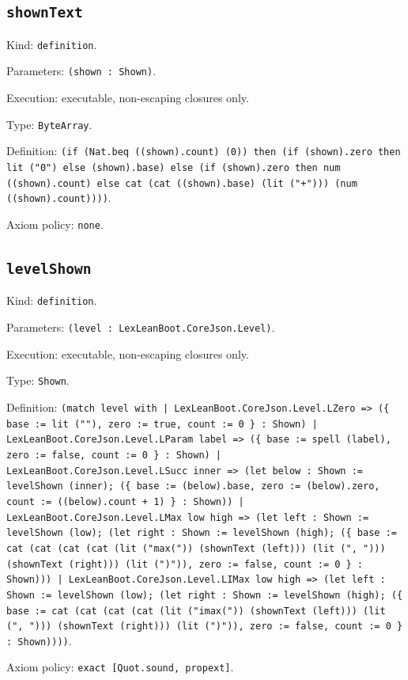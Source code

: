 \documentclass[11pt]{article}
\begin{document}
\subsection*{\texttt{shownText}}
\noindent Kind: \texttt{definition}.\par
\noindent Parameters: \texttt{(shown : Shown)}.\par
\noindent Execution: executable, non-escaping closures only.\par
\noindent Type: \texttt{ByteArray}.\par
\noindent Definition: \texttt{(if (Nat.beq ((shown).count) (0)) then (if (shown).zero then lit ("0") else (shown).base) else (if (shown).zero then num ((shown).count) else cat (cat ((shown).base) (lit ("+"))) (num ((shown).count))))}.\par
\noindent Axiom policy: \texttt{none}.\par
\subsection*{\texttt{levelShown}}
\noindent Kind: \texttt{definition}.\par
\noindent Parameters: \texttt{(level : LexLeanBoot.CoreJson.Level)}.\par
\noindent Execution: executable, non-escaping closures only.\par
\noindent Type: \texttt{Shown}.\par
\noindent Definition: \texttt{(match level with | LexLeanBoot.CoreJson.Level.LZero => (\{ base := lit (""), zero := true, count := 0 \} : Shown) | LexLeanBoot.CoreJson.Level.LParam label => (\{ base := spell (label), zero := false, count := 0 \} : Shown) | LexLeanBoot.CoreJson.Level.LSucc inner => (let below : Shown := levelShown (inner); (\{ base := (below).base, zero := (below).zero, count := ((below).count + 1) \} : Shown)) | LexLeanBoot.CoreJson.Level.LMax low high => (let left : Shown := levelShown (low); (let right : Shown := levelShown (high); (\{ base := cat (cat (cat (cat (lit ("max(")) (shownText (left))) (lit (", "))) (shownText (right))) (lit (")")), zero := false, count := 0 \} : Shown))) | LexLeanBoot.CoreJson.Level.LIMax low high => (let left : Shown := levelShown (low); (let right : Shown := levelShown (high); (\{ base := cat (cat (cat (cat (lit ("imax(")) (shownText (left))) (lit (", "))) (shownText (right))) (lit (")")), zero := false, count := 0 \} : Shown))))}.\par
\noindent Axiom policy: \texttt{exact [Quot.sound, propext]}.\par
\end{document}

